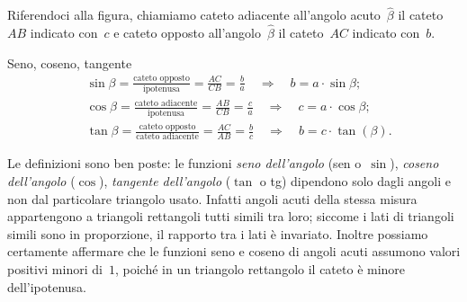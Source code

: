 Riferendoci alla figura, chiamiamo cateto adiacente all'angolo 
acuto~\(\hat{\beta}\) il cateto~\({AB}\) indicato con~\(c\) e cateto opposto 
all'angolo~\(\hat{\beta}\) il
cateto~\({AC}\) indicato con~\(b\).

\begin{definizione}
Seno, coseno, tangente
\begin{align*}
&\sin \beta=\frac{\text{cateto opposto}}{\text{ipotenusa}}=
\frac{AC}{CB}=\frac{b}{a} \quad \Rightarrow \quad b=a\cdot \sin \beta ;\\
&\cos \beta=\frac{\text{cateto adiacente}}{\text{ipotenusa}}=
\frac{AB}{CB}=\frac{c}{a} \quad \Rightarrow \quad c=a\cdot \cos \beta ;\\
&\tan \beta=\frac{\text{cateto opposto}}{\text{cateto adiacente}}=
\frac{AC}{AB}=\frac{b}{c} \quad \Rightarrow \quad b=c\cdot \tan(\beta ).
\end{align*}
\end{definizione}



Le definizioni sono ben poste: le funzioni \emph{seno dell'angolo} (sen 
o~\(\sin\)), \emph{coseno dell'angolo} (\(\cos\)), \emph{tangente dell'angolo}
(\(\tan\) o tg) dipendono solo dagli angoli e non dal particolare triangolo 
usato. 
Infatti angoli acuti della stessa misura appartengono a
triangoli rettangoli tutti simili tra loro; siccome i lati di triangoli 
simili 
sono in proporzione, il rapporto tra i lati è invariato.
Inoltre possiamo certamente affermare che le funzioni seno e coseno di angoli 
acuti assumono valori positivi minori di~\(1\),
poiché in un triangolo rettangolo il cateto è minore dell'ipotenusa.

